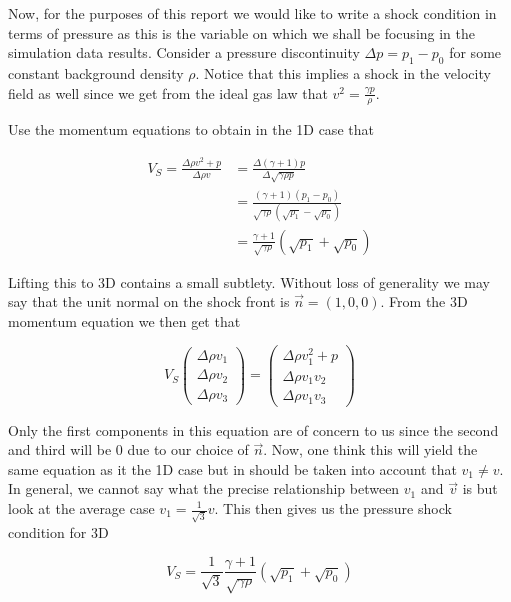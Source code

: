 Now, for the purposes of this report we would like to write a shock condition in terms of pressure as this is the variable on which we shall be focusing in the simulation data results. 
Consider a pressure discontinuity $\Delta p = p_1 - p_0$ for some constant background density $\rho$. 
Notice that this implies a shock in the velocity field as well since we get from the ideal gas law that $ v^2 = \frac{\gamma p}{\rho} $.

Use the momentum equations to obtain in the 1D case that

\begin{equation}
\label{eq:p-shock-1D}
\begin{split}
V_S = \frac{\Delta \rho v^2 + p}{\Delta \rho v} &=  \frac{\Delta(\gamma +1) p}{\Delta \sqrt{\gamma \rho p}} \\ &=
\frac{(\gamma + 1)(p_1 - p_0)}{\sqrt{\gamma \rho}(\sqrt{p_1} - \sqrt{p_0})} \\ &=
\frac{\gamma+1}{\sqrt{\gamma \rho}} (\sqrt{p_1} + \sqrt{p_0})
\end{split}
\end{equation}

Lifting this to 3D contains a small subtlety. Without loss of generality we may say that the unit normal on the shock front is $\vec{n} = (1,0,0)$. From the 3D momentum equation we then get that 

$$ V_S 
\begin{pmatrix}
\Delta \rho v_1 \\
\Delta \rho v_2 \\
\Delta \rho v_3
\end{pmatrix} 
= 
\begin{pmatrix}
\Delta \rho v^2_1 + p \\
\Delta \rho v_1 v_2 \\
\Delta \rho v_1 v_3
\end{pmatrix} 
$$

Only the first components in this equation are of concern to us since the second and third will be $0$ due to our choice of $\vec{n}$. Now, one think this will yield the same equation as it the 1D case but in should be taken into account that $v_1 \neq v$. 
In general, we cannot say what the precise relationship between $v_1$ and $\vec{v}$ is but look at the average case $v_1 = \frac{1}{\sqrt{3}} v$. This then gives us the pressure shock condition for 3D

\begin{equation}
\label{eq:p-shock-3D}
V_S = \frac{1}{\sqrt{3}} \frac{\gamma+1}{\sqrt{\gamma \rho}} (\sqrt{p_1} + \sqrt{p_0})
\end{equation}



